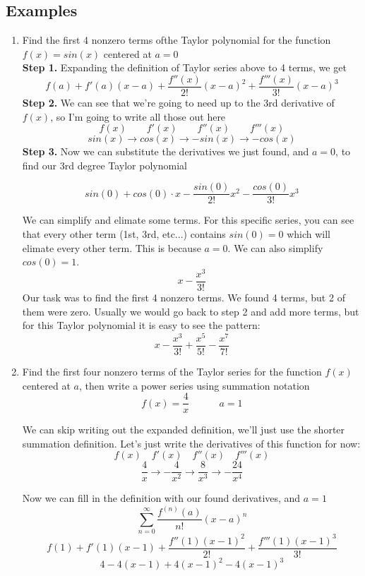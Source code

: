 \documentclass[12pt]{report}
\begin{document}
\subsection*{Examples}
\begin{enumerate}
	\item Find the first 4 nonzero terms ofthe Taylor polynomial for the function $ f(x) = sin(x) $ centered at $ a = 0 $ \\
	
	\textbf{Step 1.} Expanding the definition of Taylor series above to 4 terms, we get
	$$
		f(a) + f'(a)(x-a) + \frac{f''(x)}{2!}(x-a)^2 + \frac{f'''(x)}{3!}(x-a)^3
	$$
	\textbf{Step 2.} We can see that we're going to need up to the 3rd derivative of $ f(x) $, so I'm going to write all those out here
	$$ f(x) \quad\quad f'(x) \quad\quad f''(x) \quad\quad f'''(x)$$
	$$ sin(x) \to cos(x) \to -sin(x) \to -cos(x) $$
	\textbf{Step 3.} Now we can substitute the derivatives we just found, and $ a = 0 $, to find our 3rd degree Taylor polynomial
	
	$$ sin(0) + cos(0)\cdot x - \frac{sin(0)}{2!}x^2 - \frac{cos(0)}{3!}x^3 $$

	We can simplify and elimate some terms. For this specific series, you can see that every other term (1st, 3rd, etc...) contains $ sin(0) = 0 $ which will elimate every other term. This is because $ a = 0 $. We can also simplify $ cos(0) = 1 $.
	$$ x - \frac{x^3}{3!} $$
	Our task was to find the first 4 nonzero terms. We found 4 terms, but 2 of them were zero. Usually we would go back to step 2 and add more terms, but for this Taylor polynomial it is easy to see the pattern:
	$$ x - \frac{x^3}{3!} + \frac{x^5}{5!} - \frac{x^7}{7!} $$
	
	
	
	\item Find the first four nonzero terms of the Taylor series for the function $ f(x) $ centered at $ a $, then write a power series using summation notation\\
	$$ f(x) = \frac{4}{x} \quad \quad \quad a = 1 $$
	
	We can skip writing out the expanded definition, we'll just use the shorter summation definition. Let's just write the derivatives of this function for now:
	$$ f(x) \quad f'(x) \quad f''(x) \quad f'''(x) $$
	$$ \frac{4}{x} \to -\frac{4}{x^2} \to \frac{8}{x^3} \to -\frac{24}{x^4} $$

	Now we can fill in the definition with our found derivatives, and $ a = 1 $
	$$ \sum_{n=0}^{\infty} \frac{f^{(n)}(a)}{n!}(x-a)^n $$
	$$ f(1) + f'(1)(x-1) + \frac{f''(1)(x-1)^2}{2!} + \frac{f'''(1)(x-1)^3}{3!} $$
	$$ 4 - 4(x-1) + 4(x-1)^2 - 4(x-1)^3 $$


\end{enumerate}	
\end{document}

